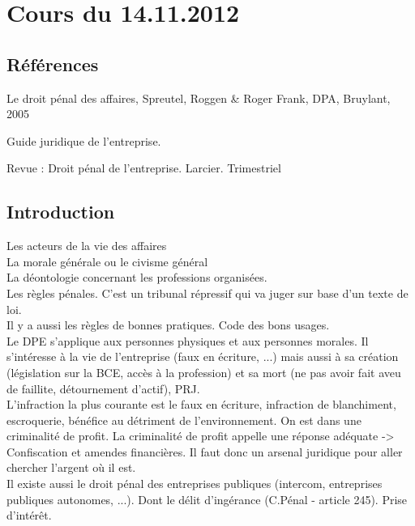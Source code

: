 \documentclass{book}
\begin{document}
\thispagestyle{empty}
\setcounter{page}{0}
\null
\newpage
{} \setcounter{page}{1} 




\tableofcontents



\chapter{Cours du 14.11.2012}
 \setcounter{page}{1} 

\section{Références}
Le droit pénal des affaires, Spreutel, Roggen & Roger Frank, DPA, Bruylant, 2005

Guide juridique de l'entreprise.

Revue : Droit pénal de l'entreprise. Larcier. Trimestriel
\section{Introduction}

Les acteurs de la vie des affaires\\
La morale générale ou le civisme général\\
La déontologie concernant les professions organisées.\\
Les règles pénales. C'est un tribunal répressif qui va juger sur base d'un texte de loi.\\

Il y a aussi les règles de bonnes pratiques. Code des bons usages.		\\

Le DPE s'applique aux personnes physiques et aux personnes morales. Il s'intéresse à la vie de l'entreprise (faux en écriture, ...) mais aussi à sa création (législation sur la BCE, accès à la profession) et sa mort (ne pas avoir fait aveu de faillite, détournement d'actif), PRJ.\\

L'infraction la plus courante est le faux en écriture, infraction de blanchiment, escroquerie, bénéfice au détriment de l'environnement. On est dans une criminalité de profit. La criminalité de profit appelle une réponse adéquate -> Confiscation et amendes financières. Il faut donc un arsenal juridique pour aller chercher l'argent où il est.\\

Il existe aussi le droit pénal des entreprises publiques (intercom, entreprises publiques autonomes, ...). Dont le délit d'ingérance (C.Pénal - article 245). Prise d'intérêt.\\
\end{document}
